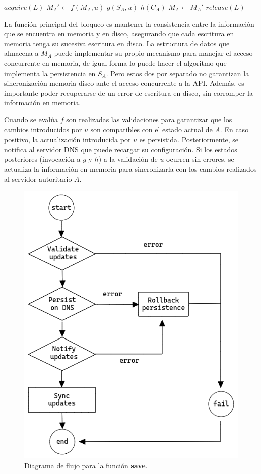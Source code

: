 \begin{algorithmic}
    \State $acquire(L)$
    \State $M_A' \leftarrow f(M_A, u)$
    \State $g(S_A, u)$
    \State $h(C_A)$
    \State $M_A \leftarrow M_A'$
    \State $release(L)$
\EndProcedure
\end{algorithmic}

La función principal del bloqueo es mantener la consistencia entre la información que se encuentra en memoria y en disco, asegurando que cada escritura en memoria tenga su sucesiva escritura en disco. La estructura de datos que almacena a $M_A$ puede implementar su propio mecanismo para manejar el acceso concurrente en memoria, de igual forma lo puede hacer el algoritmo que implementa la persistencia en $S_A$. Pero estos dos por separado no garantizan la sincronización memoria-disco ante el acceso concurrente a la API. Además, es importante poder recuperarse de un error de escritura en disco, sin corromper la información en memoria.

Cuando se evalúa $f$ son realizadas las validaciones para garantizar que los cambios introducidos por $u$ son compatibles con el estado actual de $A$. En caso positivo, la actualización introducida por $u$ es persistida. Posteriormente, se notifica al servidor DNS que puede recargar su configuración. Si los estados posteriores (invocación a $g$ y $h$) a la validación de $u$ ocurren sin errores, se actualiza la información en memoria para sincronizarla con los cambios realizados al servidor autoritario $A$.

\begin{figure}[!ht]
    \centering
    \includegraphics[width=0.6\linewidth]{draws/save.png}
    \caption{Diagrama de flujo para la función \textbf{save}.}
\end{figure}

